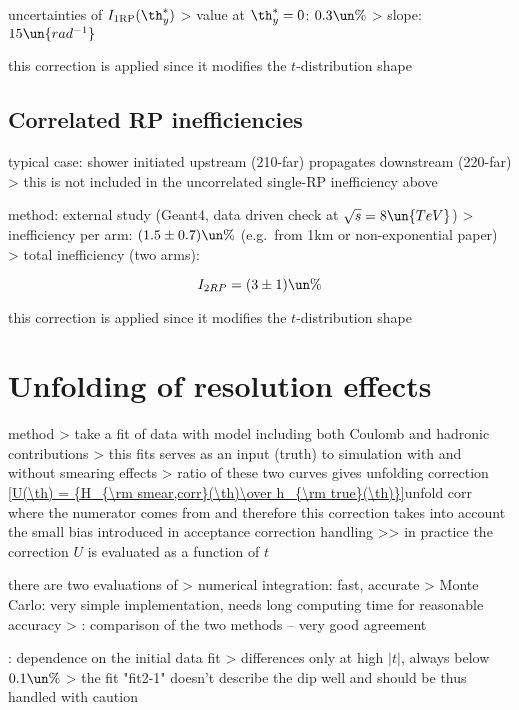\> uncertainties of $I_{\rm 1RP}(\th_y^*)$
\>> value at $\th_y^* = 0$: $0.3\un{\%}$
\>> slope: $15\un{rad^{-1}}$

\> this correction is applied since it modifies the $t$-distribution shape


\subsection[efficiency-correlated]{Correlated RP inefficiencies}

\> typical case: shower initiated upstream (210-far) propagates downstream (220-far)
\>> this is not included in the uncorrelated single-RP inefficiency above

\> method: external study (Geant4, data driven check at $\sqrt s = 8\un{TeV}$)
\>> inefficiency per arm: $(1.5 \pm 0.7)\un{\%}$ (e.g.~from 1km or non-exponential paper)
\>> total inefficiency (two arms):

$$I_{2RP} = (3 \pm 1)\un{\%}$$

\> this correction is applied since it modifies the $t$-distribution shape



\section[unfolding]{Unfolding of resolution effects}

\> method
\>> take a fit of data with model including both Coulomb and hadronic contributions
\>> this fits serves as an input (truth) to simulation with and without smearing effects
\>> ratio of these two curves gives unfolding correction
\eqref{U(\th) = {H_{\rm smear,corr}(\th)\over h_{\rm true}(\th)}}{unfold corr}
where the numerator comes from  and therefore this correction takes into account the small bias introduced in acceptance correction handling
\>>> in practice the correction $U$ is evaluated as a function of $t$

\> there are two evaluations of 
\>> numerical integration: fast, accurate
\>> Monte Carlo: very simple implementation, needs long computing time for reasonable accuracy
\>>  : comparison of the two methods -- very good agreement

\>  : dependence on the initial data fit
\>> differences only at high $|t|$, always below $0.1\un{\%}$
\>> the fit "fit2-1" doesn't describe the dip well and should be thus handled with caution

